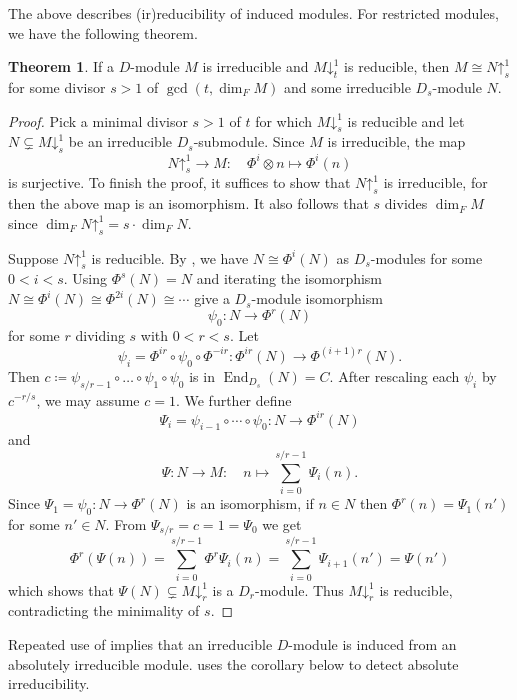 \documentclass[11pt,reqno]{amsart}
\theoremstyle{definition}
\newtheorem{theorem}{Theorem}[section]
\DeclareMathOperator{\End}{End}
\newcommand{\pda}{\mathord{\downarrow}}
\newcommand{\pua}{\mathord{\uparrow}}
\begin{document}
The above describes (ir)reducibility of induced modules. For restricted modules, we have the following theorem.

\begin{theorem}
\label{thm:absolute-irreducibility}
If a $D$-module $M$ is irreducible and $M\pda^{1}_{t}$ is reducible,
then $M \cong N\pua^{1}_{s}$ for some divisor $s>1$ of $\gcd(t,\dim_FM)$ and some irreducible $D_{s}$-module $N$.
\end{theorem}

\begin{proof}
Pick a minimal divisor $s>1$ of $t$ for which $M\pda^{1}_{s}$ is reducible and 
let $N\subsetneq M\pda^{1}_{s}$ be an irreducible $D_{s}$-submodule.
Since $M$ is irreducible, the map 
\[
    N\pua^{1}_{s}\to M\colon \quad \Phi^{i}\otimes n\mapsto \Phi^{i}(n)
\]
is surjective. 
To finish the proof, it suffices to show that $N\pua^{1}_{s}$ is irreducible, for then the above map is an isomorphism. It also follows that $s$ divides $\dim_{F}M$ since $\dim_{F}N\pua^{1}_{s}=s\cdot\dim_{F}N$.

Suppose $N\pua^{1}_{s}$ is reducible. 
By , 
we have $N\cong \Phi^{i}(N)$ as $D_{s}$-modules for some $0 < i < s$. Using $\Phi^s(N)=N$ and iterating the isomorphism $N\cong \Phi^{i}(N) \cong \Phi^{2i}(N)\cong \cdots$ give a $D_{s}$-module isomorphism 
\[
    \psi_{0}\colon N\to \Phi^{r}(N)
\]
for some $r$ dividing $s$ with $0<r<s$. 
Let 
\[
    \psi_i=\Phi^{ir}\circ\psi_0\circ\Phi^{-ir} \colon \Phi^{ir}(N) \rightarrow \Phi^{(i+1)r}(N).
\]
Then $c\coloneqq\psi_{s/r-1}\circ\ldots\circ\psi_{1}\circ\psi_0$ is in $\End_{D_{s}}(N) = C$. 
After rescaling each $\psi_i$ by ${c}^{-r/s}$, we may assume $c=1$. We further define 
\[
    \Psi_i = \psi_{i-1}\circ\cdots\circ\psi_0 \colon N \to \Phi^{ir}(N)
\]
and
\[
\Psi\colon N \to M\colon \quad n\mapsto \sum_{i=0}^{s/r-1} \Psi_i(n).
\]
Since $\Psi_1 =\psi_0\colon N\to \Phi^{r}(N)$ is an isomorphism, 
if $n\in N$ then $\Phi^r(n)=\Psi_1(n')$
for some $n'\in N$. 
From $\Psi_{s/r}=c=1=\Psi_{0}$ we get
\[
    \Phi^r\left(\Psi(n)\right) =  \sum_{i=0}^{s/r-1} \Phi^r \Psi_i(n) = \sum_{i=0}^{s/r-1} \Psi_{i+1}(n') = \Psi(n')
\]
which shows that $\Psi(N) \subsetneq M\pda^1_r$ is a $D_r$-module. 
Thus $M\pda^1_r$ is reducible, contradicting the minimality of $s$.
\end{proof}

Repeated use of  implies that an irreducible $D$-module is induced from an absolutely irreducible module.
\cite{bou2024solving} uses the corollary below to detect absolute irreducibility.
\end{document}
